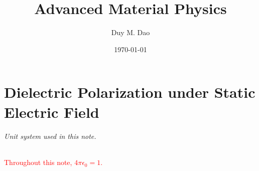 \documentclass[11pt]{article}      %
\title{Advanced Material Physics}
\author{Duy M. Dao}
\date{\today}                      %
\numberwithin{equation}{section}   %
\begin{document}
\maketitle                         %

\newpage

\part{Dielectric Polarization under Static Electric Field}

\paragraph{Unit system used in this note.}
\textcolor{red}{Throughout this note, $4\pi\epsilon_0 = 1$.}






\end{document}

